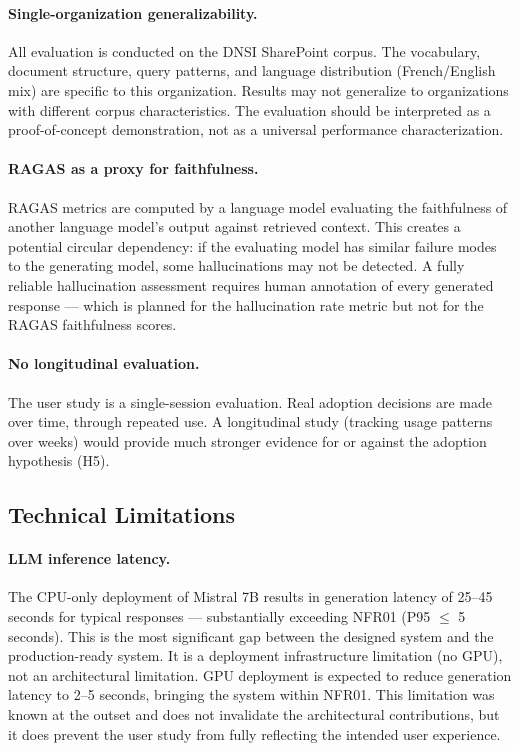 \paragraph{Single-organization generalizability.} All evaluation is conducted on the DNSI SharePoint corpus. The vocabulary, document structure, query patterns, and language distribution (French/English mix) are specific to this organization. Results may not generalize to organizations with different corpus characteristics. The evaluation should be interpreted as a proof-of-concept demonstration, not as a universal performance characterization.

\paragraph{RAGAS as a proxy for faithfulness.} RAGAS metrics are computed by a language model evaluating the faithfulness of another language model's output against retrieved context. This creates a potential circular dependency: if the evaluating model has similar failure modes to the generating model, some hallucinations may not be detected. A fully reliable hallucination assessment requires human annotation of every generated response --- which is planned for the hallucination rate metric but not for the RAGAS faithfulness scores.

\paragraph{No longitudinal evaluation.} The user study is a single-session evaluation. Real adoption decisions are made over time, through repeated use. A longitudinal study (tracking usage patterns over weeks) would provide much stronger evidence for or against the adoption hypothesis (H5).

\subsection{Technical Limitations}

\paragraph{LLM inference latency.} The CPU-only deployment of Mistral 7B results in generation latency of 25--45 seconds for typical responses --- substantially exceeding NFR01 (P95 $\leq$ 5 seconds). This is the most significant gap between the designed system and the production-ready system. It is a deployment infrastructure limitation (no GPU), not an architectural limitation. GPU deployment is expected to reduce generation latency to 2--5 seconds, bringing the system within NFR01. This limitation was known at the outset and does not invalidate the architectural contributions, but it does prevent the user study from fully reflecting the intended user experience.

